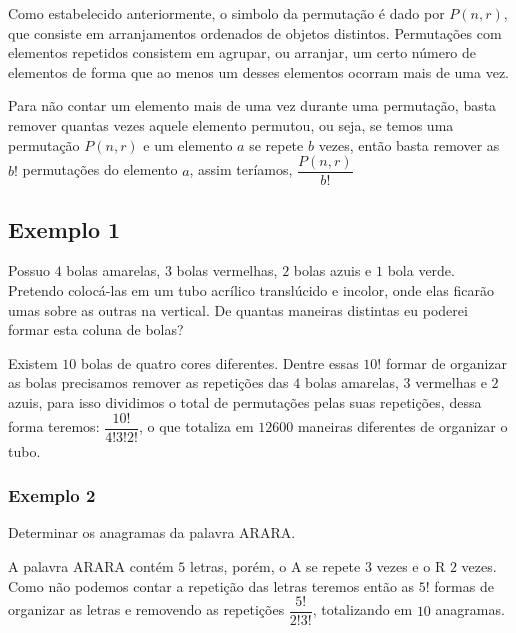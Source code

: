 Como estabelecido anteriormente, o simbolo da permutação é dado por $P(n,r)$, que consiste em arranjamentos ordenados de objetos distintos. Permutações com elementos repetidos consistem em agrupar, ou arranjar, um certo número de elementos de forma que ao menos um desses elementos ocorram mais de uma vez.

Para não contar um elemento mais de uma vez durante uma permutação, basta remover quantas vezes aquele elemento permutou, ou seja, se temos uma permutação $P(n,r)$ e um elemento $a$ se repete $b$ vezes, então basta remover as $b!$ permutações do elemento $a$, assim teríamos, $\dfrac{P(n,r)}{b!}$


\subsection*{Exemplo 1}
Possuo $4$ bolas amarelas, $3$ bolas vermelhas, $2$ bolas azuis e $1$ bola verde. Pretendo colocá-las em um tubo acrílico translúcido e incolor, onde elas ficarão umas sobre as outras na vertical. De quantas maneiras distintas eu poderei formar esta coluna de bolas?

Existem $10$ bolas de quatro cores diferentes. Dentre essas $10!$ formar de organizar as bolas precisamos remover as repetições das $4$ bolas amarelas, $3$ vermelhas e $2$ azuis, para isso dividimos o total de permutações pelas suas repetições, dessa forma teremos: $\dfrac{10!}{4! 3! 2!}$, o que totaliza em $12600$ maneiras diferentes de organizar o tubo.

\subsubsection*{Exemplo 2}
Determinar os anagramas da palavra ARARA. 

A palavra ARARA contém $5$ letras, porém, o A se repete $3$ vezes e o R $2$ vezes. Como não podemos contar a repetição das letras teremos então as $5!$ formas de organizar as letras e removendo as repetições $\dfrac{5!}{2! 3!}$, totalizando em $10$ anagramas.


